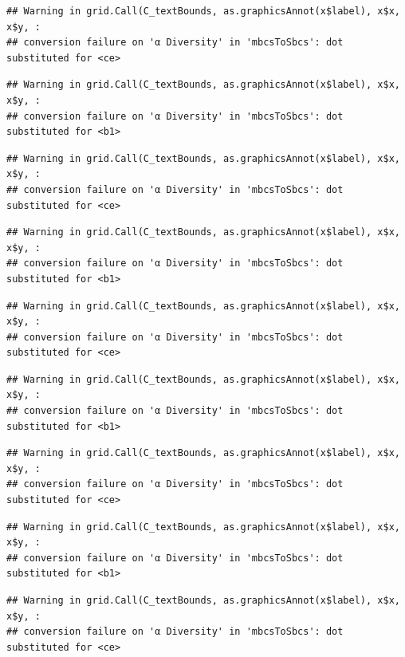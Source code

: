 \documentclass[
]{article}
\begin{document}
\begin{verbatim}
## Warning in grid.Call(C_textBounds, as.graphicsAnnot(x$label), x$x, x$y, :
## conversion failure on 'α Diversity' in 'mbcsToSbcs': dot substituted for <ce>
\end{verbatim}

\begin{verbatim}
## Warning in grid.Call(C_textBounds, as.graphicsAnnot(x$label), x$x, x$y, :
## conversion failure on 'α Diversity' in 'mbcsToSbcs': dot substituted for <b1>
\end{verbatim}

\begin{verbatim}
## Warning in grid.Call(C_textBounds, as.graphicsAnnot(x$label), x$x, x$y, :
## conversion failure on 'α Diversity' in 'mbcsToSbcs': dot substituted for <ce>
\end{verbatim}

\begin{verbatim}
## Warning in grid.Call(C_textBounds, as.graphicsAnnot(x$label), x$x, x$y, :
## conversion failure on 'α Diversity' in 'mbcsToSbcs': dot substituted for <b1>
\end{verbatim}

\begin{verbatim}
## Warning in grid.Call(C_textBounds, as.graphicsAnnot(x$label), x$x, x$y, :
## conversion failure on 'α Diversity' in 'mbcsToSbcs': dot substituted for <ce>
\end{verbatim}

\begin{verbatim}
## Warning in grid.Call(C_textBounds, as.graphicsAnnot(x$label), x$x, x$y, :
## conversion failure on 'α Diversity' in 'mbcsToSbcs': dot substituted for <b1>
\end{verbatim}

\begin{verbatim}
## Warning in grid.Call(C_textBounds, as.graphicsAnnot(x$label), x$x, x$y, :
## conversion failure on 'α Diversity' in 'mbcsToSbcs': dot substituted for <ce>
\end{verbatim}

\begin{verbatim}
## Warning in grid.Call(C_textBounds, as.graphicsAnnot(x$label), x$x, x$y, :
## conversion failure on 'α Diversity' in 'mbcsToSbcs': dot substituted for <b1>
\end{verbatim}

\begin{verbatim}
## Warning in grid.Call(C_textBounds, as.graphicsAnnot(x$label), x$x, x$y, :
## conversion failure on 'α Diversity' in 'mbcsToSbcs': dot substituted for <ce>
\end{verbatim}
\end{document}
